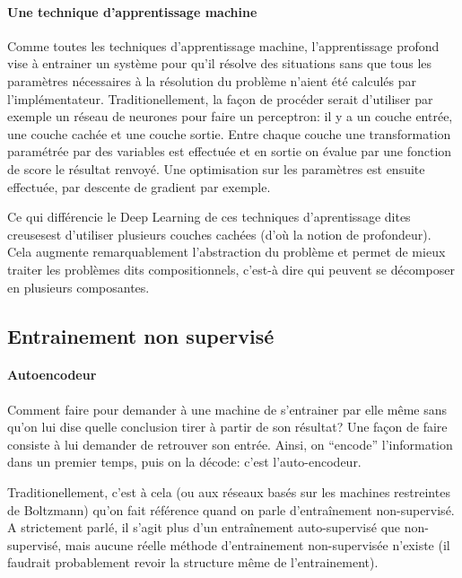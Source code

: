 \documentclass[a4paper,11pt, twocolumn]{article}
\begin{document}
\paragraph{Une technique d'apprentissage machine}

Comme toutes les techniques d'apprentissage machine, l'apprentissage profond
vise à entrainer un système pour qu'il résolve des situations sans que tous les
paramètres nécessaires à la résolution du problème n'aient été calculés par
l'implémentateur. Traditionellement, la façon de procéder serait d'utiliser par
exemple un réseau de neurones pour faire un perceptron: il y a un couche entrée,
une couche cachée et une couche sortie. Entre chaque couche une transformation
paramétrée par des variables est effectuée et en sortie on évalue par une
fonction de score le résultat renvoyé. Une optimisation sur les paramètres est
ensuite effectuée, par descente de gradient par exemple.

Ce qui différencie le Deep Learning de ces techniques d'aprentissage dites \og
creuses\fg est d'utiliser plusieurs couches cachées (d'où la notion de
profondeur). Cela augmente remarquablement l'abstraction du problème et permet
de mieux traiter les problèmes dits compositionnels, c'est-à dire qui peuvent se
décomposer en plusieurs composantes.

\subsection{Entrainement non supervisé}

\paragraph{Autoencodeur}

Comment faire pour demander à une machine de s'entrainer par elle même sans
qu'on lui dise quelle conclusion tirer à partir de son résultat? Une façon de
faire consiste à lui demander de retrouver son entrée. Ainsi, on ``encode''
l'information dans un premier temps, puis on la décode: c'est l'auto-encodeur.

Traditionellement, c'est à cela (ou aux réseaux basés sur les machines
restreintes de Boltzmann) qu'on fait référence quand on parle d'entraînement
non-supervisé. A strictement parlé, il s'agit plus d'un entraînement
auto-supervisé que non-supervisé, mais aucune réelle méthode d'entrainement
non-supervisée n'existe (il faudrait probablement revoir la structure même de
l'entrainement).
\end{document}
